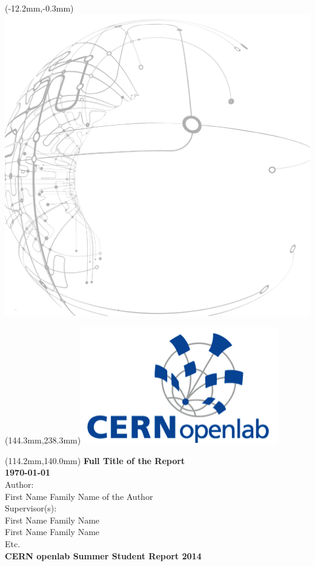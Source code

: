 \documentclass[11pt, letterpaper]{article}            %
\begin{document}
\begin{textblock*}{0mm}(-12.2mm,-0.3mm)\noindent \includegraphics*{./gfx/bg.png}\end{textblock*}
\begin{textblock*}{0mm}(144.3mm,238.3mm)\noindent \includegraphics*{./gfx/openlab.png}\end{textblock*}
\begin{textblock*}{150mm}(114.2mm,140.0mm)\noindent
{\bfseries\sffamily\textbf{\fontsize{20}{20}\selectfont\color{natc}Full Title of the Report}}\\[36pt]
{\bfseries\sffamily\textbf{\fontsize{16}{20}\selectfont\color{natc}\motd\today}}\\[18pt]
{\sffamily\fontsize{14}{20}\selectfont\color{subc}Author:}\\
{\sffamily\fontsize{14}{20}\selectfont\color{subc}First Name Family Name of the Author}\\[18pt]
{\sffamily\fontsize{14}{20}\selectfont\color{subc}Supervisor(s):}\\
{\sffamily\fontsize{14}{20}\selectfont\color{subc}First Name Family Name}\\
{\sffamily\fontsize{14}{20}\selectfont\color{subc}First Name Family Name}\\
{\sffamily\fontsize{14}{20}\selectfont\color{subc}Etc.}\\[18pt]
\textbf{\bfseries\sffamily\fontsize{11}{20}\selectfont\color{subc}CERN openlab Summer Student Report 2014}

\end{textblock*}
~
\thispagestyle{empty}
\newpage
\end{document}
